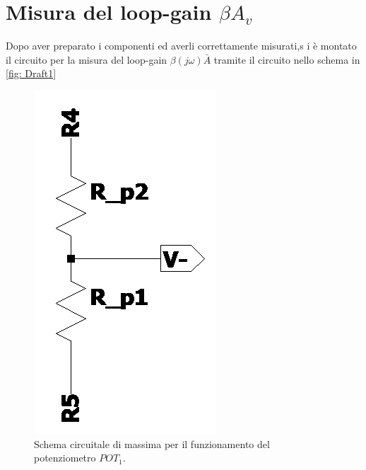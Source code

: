\documentclass[10pt, a4paper, italian]{article}
\begin{document}
\section{Misura del loop-gain $\beta A_v$}
Dopo aver preparato i componenti ed averli correttamente misurati,s i è montato il circuito per la misura del loop-gain
$\beta(j\omega) \bar{A}$ tramite il circuito nello schema in \cref{fig: Draft1}
\begin{figure}[H]
    \centering
	\includegraphics[scale=0.5]{Draft3}
    \caption{Schema circuitale di massima per il funzionamento del potenziometro $POT_1$.
    \label{fig: Draft3}}
\end{figure}
\end{document}
